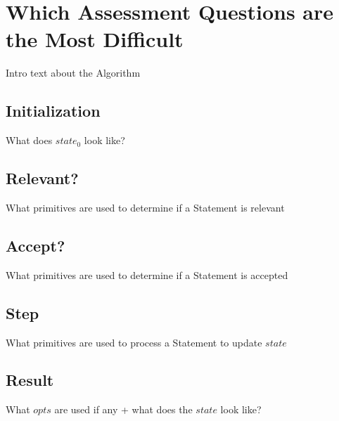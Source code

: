 \documentclass[../main.tex]{subfiles}
\begin{document}
\section{Which Assessment Questions are the Most Difficult}
Intro text about the Algorithm
\subsection{Initialization}
What does $state_{0}$ look like?
\subsection{Relevant?}
What primitives are used to determine if a Statement is relevant
\subsection{Accept?}
What primitives are used to determine if a Statement is accepted
\subsection{Step}
What primitives are used to process a Statement to update $state$
\subsection{Result}
What $opts$ are used if any + what does the $state$ look like?
\end{document}
